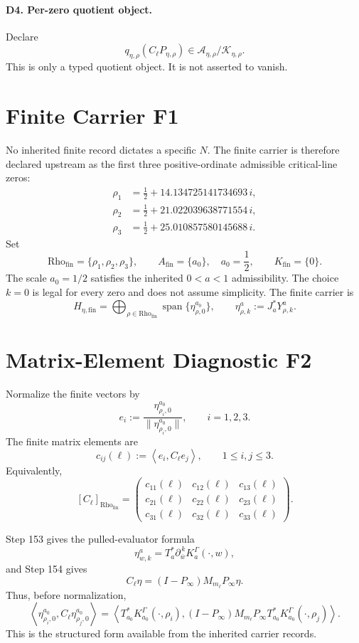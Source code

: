 \documentclass[11pt]{article}
\newcommand{\cA}{\mathcal A}
\newcommand{\cK}{\mathcal K}
\newcommand{\Rfin}{\mathrm{Rho}_{\mathrm{fin}}}
\newcommand{\Afin}{A_{\mathrm{fin}}}
\newcommand{\Kfin}{K_{\mathrm{fin}}}
\newcommand{\Petarho}{P_{\eta,\rho}}
\newcommand{\Cell}{C_{\ell}}
\newcommand{\minner}[2]{\left\langle #1,#2\right\rangle}
\begin{document}
\paragraph{D4. Per-zero quotient object.}
Declare
\[
  q_{\eta,\rho}(\Cell\Petarho)
  \in
  \cA_{\eta,\rho}/\cK_{\eta,\rho}.
\]
This is only a typed quotient object. It is not asserted to vanish.

\section*{Finite Carrier F1}

No inherited finite record dictates a specific \(N\). The finite carrier is
therefore declared upstream as the first three positive-ordinate admissible
critical-line zeros:
\[
\begin{aligned}
  \rho_1 &= \frac12 + 14.134725141734693\,i,\\
  \rho_2 &= \frac12 + 21.022039638771554\,i,\\
  \rho_3 &= \frac12 + 25.010857580145688\,i.
\end{aligned}
\]
Set
\[
  \Rfin=\{\rho_1,\rho_2,\rho_3\},
  \qquad
  \Afin=\{a_0\},\quad a_0=\frac12,
  \qquad
  \Kfin=\{0\}.
\]
The scale \(a_0=1/2\) satisfies the inherited \(0<a<1\) admissibility.
The choice \(k=0\) is legal for every zero and does not assume simplicity.
The finite carrier is
\[
  H_{\eta,\mathrm{fin}}
  =
  \bigoplus_{\rho\in\Rfin}
  \operatorname{span}\{\eta^{a_0}_{\rho,0}\},
  \qquad
  \eta^a_{\rho,k}:=J_a^*Y^a_{\rho,k}.
\]

\section*{Matrix-Element Diagnostic F2}

Normalize the finite vectors by
\[
  e_i
  :=
  \frac{\eta^{a_0}_{\rho_i,0}}
       {\|\eta^{a_0}_{\rho_i,0}\|},
  \qquad i=1,2,3.
\]
The finite matrix elements are
\[
  c_{ij}(\ell)
  :=
  \minner{e_i}{\Cell e_j},
  \qquad
  1\leq i,j\leq 3.
\]
Equivalently,
\[
  [\Cell]_{\Rfin}
  =
  \begin{pmatrix}
  c_{11}(\ell)&c_{12}(\ell)&c_{13}(\ell)\\
  c_{21}(\ell)&c_{22}(\ell)&c_{23}(\ell)\\
  c_{31}(\ell)&c_{32}(\ell)&c_{33}(\ell)
  \end{pmatrix}.
\]

Step 153 gives the pulled-evaluator formula
\[
  \eta^a_{w,k}
  =
  T_a^*\partial_{\bar w}^{\,k}K_a^\Gamma(\cdot,w),
\]
and Step 154 gives
\[
  \Cell\eta
  =
  (I-P_\infty)M_{m_\ell}P_\infty\eta.
\]
Thus, before normalization,
\[
  \minner{\eta^{a_0}_{\rho_i,0}}
          {\Cell\eta^{a_0}_{\rho_j,0}}
  =
  \minner{
    T_{a_0}^*K_{a_0}^\Gamma(\cdot,\rho_i)}
    {(I-P_\infty)M_{m_\ell}P_\infty
     T_{a_0}^*K_{a_0}^\Gamma(\cdot,\rho_j)}.
\]
This is the structured form available from the inherited carrier records.
\end{document}
